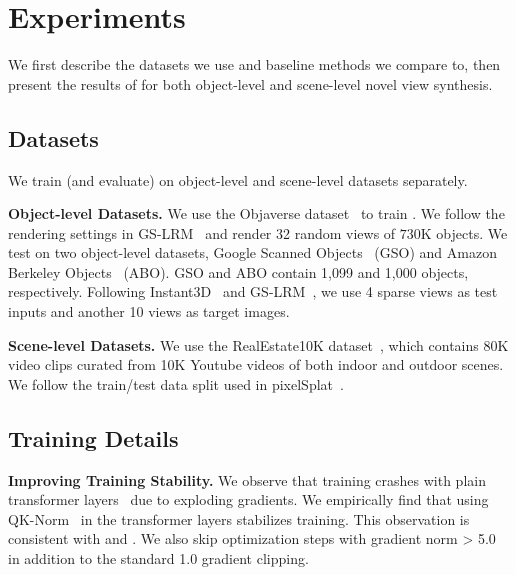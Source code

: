 \section{Experiments}
\label{sec:experiments}
We first describe the datasets we use and baseline methods we compare to, then present the results of \paperName{} for both object-level and scene-level novel view synthesis.


\subsection{Datasets}
\label{sec: exp_setup}
We train (and evaluate) \paperName{} on object-level and scene-level datasets separately.

\vspace{-1mm}
\textbf{Object-level Datasets. } We use the Objaverse dataset~\citep{deitke2023objaverse} to train \paperName{}. We follow the rendering settings in GS-LRM~\citep{zhang2024gslrmlargereconstructionmodel} and render 32 random views of $730$K objects. We test on two object-level datasets, Google Scanned Objects~\citep{downs2022gso} (GSO) and Amazon Berkeley Objects~\citep{collins2022abo} (ABO). 
GSO and ABO contain 1,099 and 1,000 objects, respectively. Following Instant3D~\citep{li2023instant3d} and GS-LRM~\citep{zhang2024gslrmlargereconstructionmodel}, we use 4 sparse views as test inputs and another 10 views as target images.

\vspace{-1mm}
\textbf{Scene-level Datasets. } We use the RealEstate10K dataset~\citep{realestate10k_zhou2018stereo}, which contains 80K video clips curated from 10K Youtube videos of both indoor and outdoor scenes. We follow the train/test data split used in pixelSplat~\citep{charatan2024pixelsplat}.

\vspace{-1mm}
\subsection{Training Details}
\label{sec: exp_details}
\vspace{-1mm}
\textbf{Improving Training Stability.} 
We observe that \paperName{} training crashes with plain transformer layers~\citep{vaswani2017transformer} due to exploding gradients.
We empirically find that using QK-Norm~\citep{henry2020qknorm} in the transformer layers stabilizes training.
This observation is consistent with \citet{bruce2024genie} and \citet{esser2024sd3}.
We also skip optimization steps with gradient norm > 5.0 in addition to the standard 1.0 gradient clipping.

